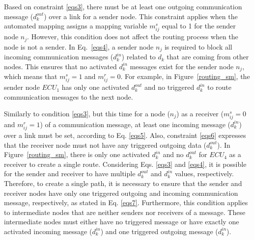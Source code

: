 	Based on constraint \eqref{eqs3}, there must be at least one outgoing communication message ($d_k^{out}$) over a link for a sender node. This constraint applies when the automated mapping assigns a mapping variable $m_{ij}^{s}$ equal to 1 for the sender node $n_j$. However, this condition does not affect the routing process when the node is not a sender.
    In Eq.~\eqref{eqs4}, a sender node $n_j$ is required to block all incoming communication messages ($d_k^{in}$) related to $d_k$ that are coming from other nodes. This ensures that no activated $d_k^{in}$ messages exist for the sender node $n_j$, which means that $m_{ij}^{s} = 1$ and $m_{ij}^{r} = 0$. For example, in Figure~\ref{routing_sm}, the sender node $ECU_1$ has only one activated $d_k^{out}$ and no triggered $d_k^{in}$ to route communication messages to the next node. 
	
	
	Similarly to condition \eqref{eqs3}, but this time for a node ($n_j$) as a receiver ($m_{ij}^{s} =0$ and $m_{ij}^{r} =1$) of a communication message, at least one incoming message ($d_k^{in}$) over a link must be set, according to Eq. \eqref{eqs5}. Also, constraint \eqref{eqs6} expresses that the receiver node must not have any triggered outgoing data ($d_k^{out}$). In Figure~\ref{routing_sm}, there is only one activated $d_k^{in}$ and no $d_k^{out}$ for $ECU_4$ as a receiver to create a single route.
	Considering Eqs. \eqref{eqs3} and \eqref{eqs4}, it is possible for the sender and receiver to have multiple $d_k^{out}$ and $d_k^{in}$ values, respectively. Therefore, to create a single path, it is necessary to ensure that the sender and receiver nodes have only one triggered outgoing and incoming communication message, respectively, as stated in Eq. \eqref{eqs7}. Furthermore, this condition applies to intermediate nodes that are neither senders nor receivers of a message. These intermediate nodes must either have no triggered message or have exactly one activated incoming message ($d_k^{in}$) and one triggered outgoing message ($d_k^{in}$). 
	
